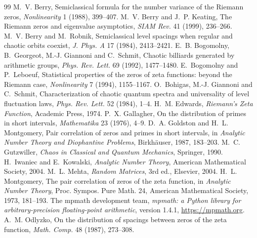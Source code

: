 \documentclass[11pt]{article}
\begin{document}
\begin{thebibliography}{99}
 M.~V. Berry, Semiclassical formula for the number variance of the Riemann zeros, \emph{Nonlinearity} 1 (1988), 399--407.
 M.~V. Berry and J.~P. Keating, The Riemann zeros and eigenvalue asymptotics, \emph{SIAM Rev.} 41 (1999), 236--266.
 M.~V. Berry and M.~Robnik, Semiclassical level spacings when regular and chaotic orbits coexist, \emph{J. Phys. A} 17 (1984), 2413--2421.
 E.~B. Bogomolny, B.~Georgeot, M.-J. Giannoni and C.~Schmit, Chaotic billiards generated by arithmetic groups, \emph{Phys. Rev. Lett.} 69 (1992), 1477--1480.
 E.~Bogomolny and P.~Leboeuf, Statistical properties of the zeros of zeta functions: beyond the Riemann case, \emph{Nonlinearity} 7 (1994), 1155--1167.
 O.~Bohigas, M.-J. Giannoni and C.~Schmit, Characterization of chaotic quantum spectra and universality of level fluctuation laws, \emph{Phys. Rev. Lett.} 52 (1984), 1--4.
 H.~M. Edwards, \emph{Riemann's Zeta Function}, Academic Press, 1974.
 P.~X. Gallagher, On the distribution of primes in short intervals, \emph{Mathematika} 23 (1976), 4--9.
 D.~A. Goldston and H.~L. Montgomery, Pair correlation of zeros and primes in short intervals, in \emph{Analytic Number Theory and Diophantine Problems}, Birkh\"auser, 1987, 183--203.
 M.~C. Gutzwiller, \emph{Chaos in Classical and Quantum Mechanics}, Springer, 1990.
 H.~Iwaniec and E.~Kowalski, \emph{Analytic Number Theory}, American Mathematical Society, 2004.
 M.~L. Mehta, \emph{Random Matrices}, 3rd ed., Elsevier, 2004.
 H.~L. Montgomery, The pair correlation of zeros of the zeta function, in \emph{Analytic Number Theory}, Proc. Sympos. Pure Math. 24, American Mathematical Society, 1973, 181--193.
 The mpmath development team, \emph{mpmath: a Python library for arbitrary-precision floating-point arithmetic}, version 1.4.1, \url{https://mpmath.org}.
 A.~M. Odlyzko, On the distribution of spacings between zeros of the zeta function, \emph{Math. Comp.} 48 (1987), 273--308.
\end{thebibliography}
\end{document}
